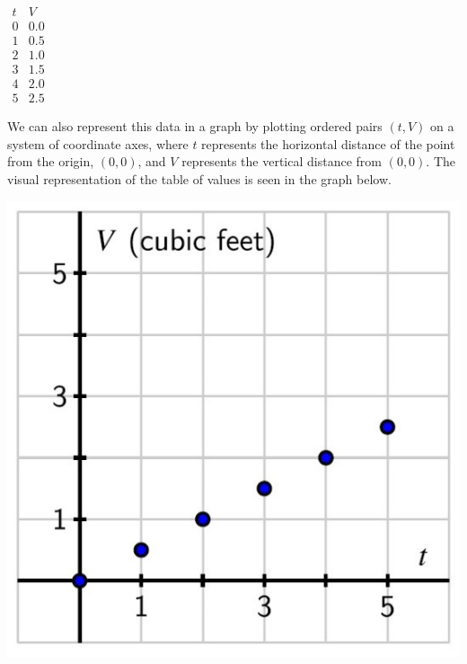\documentclass{ximera}
\begin{document}
\begin{center}
\(
\begin{array}{cc}
t&V\\
\hline
0&0.0\\
1&0.5\\
2&1.0\\
3&1.5\\
4&2.0\\
5&2.5
\end{array}
\)
\end{center}



We can also represent this data in a graph by plotting ordered pairs \((t,V)\) on a system of coordinate axes, where \(t\) represents the horizontal distance of the point from the origin, \((0,0)\), and \(V\) represents the vertical distance from \((0,0)\).  The visual representation of the table of values is seen in the graph below.%

\begin{image}
\includegraphics[width=\textwidth]{CiTtext3.jpg}
\end{image}
\end{document}
